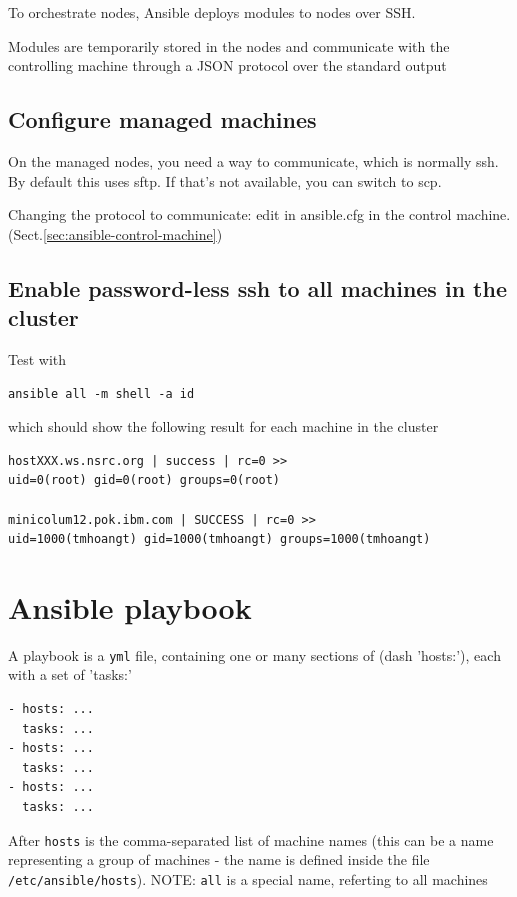 To orchestrate nodes, Ansible deploys modules to nodes over SSH.

Modules are temporarily stored in the nodes and communicate with the controlling
machine through a JSON protocol over the standard output

\subsection{Configure managed machines}

On the managed nodes, you need a way to communicate, which is normally ssh. By
default this uses sftp. If that's not available, you can switch to scp.


Changing the protocol to communicate: edit in
ansible.cfg in the control machine. (Sect.\ref{sec:ansible-control-machine})



\subsection{Enable password-less ssh to all machines in the cluster}

Test with
\begin{verbatim}
ansible all -m shell -a id
\end{verbatim}
which should show the following result for each machine in the cluster
\begin{verbatim}
hostXXX.ws.nsrc.org | success | rc=0 >>
uid=0(root) gid=0(root) groups=0(root)

minicolum12.pok.ibm.com | SUCCESS | rc=0 >>
uid=1000(tmhoangt) gid=1000(tmhoangt) groups=1000(tmhoangt)
\end{verbatim}

\section{Ansible playbook}

A playbook is a \verb!yml! file, containing one or many sections of 
(dash 'hosts:'), each with a set of 'tasks:'
\begin{verbatim}
- hosts: ...
  tasks: ...
- hosts: ...
  tasks: ...
- hosts: ...
  tasks: ...
\end{verbatim}
  
After \verb!hosts! is the comma-separated list of machine names (this can be a
name representing a group of machines - the name is defined inside the file
\verb!/etc/ansible/hosts!). NOTE: \verb!all! is a special name, referting to all
machines

